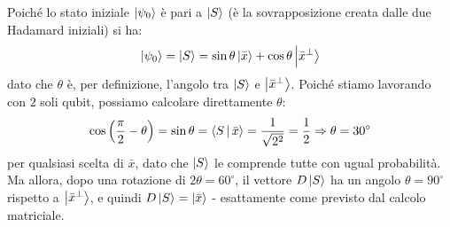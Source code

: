 \documentclass[../../InformazioneQuantistica.tex]{subfiles}
\begin{document}
Poiché lo stato iniziale $\Ket{\psi_0}$ è pari a $\Ket{S}$ (è la sovrapposizione creata dalle due Hadamard iniziali) si ha:
\begin{align*}
    \Ket{\psi_0} = \Ket{S} = \sin\theta \Ket{\bar{x}} + \cos\theta \Ket{\bar{x}^\perp}
\end{align*}
dato che $\theta$ è, per definizione, l'angolo tra $\Ket{S}$ e $\Ket{\bar{x}^\perp}$. Poiché stiamo lavorando con $2$ soli qubit, possiamo calcolare direttamente $\theta$:
\begin{align*}
    \cos\left(\frac{\pi}{2}-\theta\right) = \sin\theta = \Braket{S|\bar{x}} = \frac{1}{\sqrt{2^2}} = \frac{1}{2} \Rightarrow \theta = 30^\circ
\end{align*}
per qualsiasi scelta di $\bar{x}$, dato che $\Ket{S}$ le comprende tutte con ugual probabilità.\\
Ma allora, dopo una rotazione di $2\theta = 60^\circ$, il vettore $D\Ket{S}$ ha un angolo $\theta = 90^\circ$ rispetto a $\Ket{\bar{x}^\perp}$, e quindi $D\Ket{S} = \Ket{\bar{x}}$ - esattamente come previsto dal calcolo matriciale.\\
\end{document}
